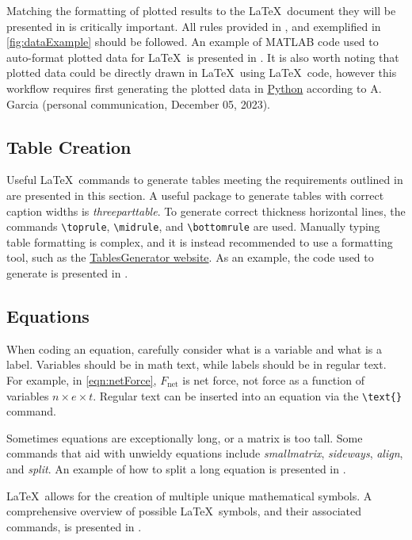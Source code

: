 Matching the formatting of plotted results to the \LaTeX\ document they will be presented in is critically important. 
All rules provided in , and exemplified in \cref{fig:dataExample} should be followed. 
An example of MATLAB code used to auto-format plotted data for \LaTeX\ is presented in . 
It is also worth noting that plotted data could be directly drawn in \LaTeX\, using \LaTeX\ code, however this workflow requires first generating the plotted data in \href{https://www.python.org/}{Python} according to A. Garcia (personal communication, December 05, 2023).

\subsection{Table Creation}
Useful \LaTeX\ commands to generate tables meeting the requirements outlined in  are presented in this section. 
A useful package to generate tables with correct caption widths is \textit{threeparttable}. 
To generate correct thickness horizontal lines, the commands \verb*|\toprule|, \verb*|\midrule|, and \verb*|\bottomrule| are used. 
Manually typing table formatting is complex, and it is instead recommended to use a formatting tool, such as the \href{https://www.tablesgenerator.com/}{TablesGenerator website}. 
As an example, the code used to generate  is presented in . 


\subsection{Equations}
When coding an equation, carefully consider what is a variable and what is a label. 
Variables should be in math text, while labels should be in regular text. 
For example, in \cref{eqn:netForce}, $F_{\text{net}}$ is net force, not force as a function of variables $n \times e \times t$. 
Regular text can be inserted into an equation via the \verb*|\text{}| command. 


Sometimes equations are exceptionally long, or a matrix is too tall. Some commands that aid with unwieldy equations include \textit{smallmatrix}, \textit{sideways}, \textit{align}, and \textit{split}.	
An example of how to split a long equation is presented in .


\LaTeX\ allows for the creation of multiple unique mathematical symbols. A comprehensive overview of possible \LaTeX\ symbols, and their associated commands, is presented in . 

